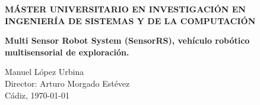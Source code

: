 \begin{titlepage}
\begin{center}
    \Large{\textbf{MÁSTER UNIVERSITARIO EN INVESTIGACIÓN EN INGENIERÍA DE SISTEMAS Y DE LA COMPUTACIÓN}} \\

    \vspace{3.0cm}

    \Large{\textbf{ Multi Sensor Robot System (SensorRS), vehículo robótico multisensorial de exploración. }} \\

    \vspace{3.0cm}

    \normalsize{Manuel López Urbina \\
    Director: Arturo Morgado Estévez }\\

    \vspace{1.5cm}
    Cádiz, \today

  \end{center}
\end{titlepage}


